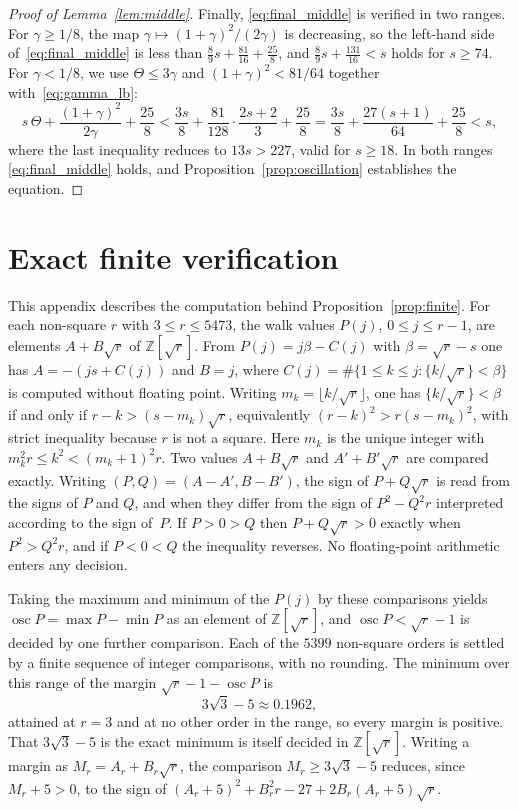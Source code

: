 \documentclass{birkjour}
\theoremstyle{definition}
\theoremstyle{remark}
\newcommand{\fl}[1]{\lfloor #1 \rfloor}
\newcommand{\frc}[1]{\{ #1 \}}
\begin{document}
\begin{proof}[Proof of Lemma~\ref{lem:middle}]
Finally, \eqref{eq:final_middle} is verified in two
ranges. For $\gamma\ge 1/8$, the map
$\gamma\mapsto(1+\gamma)^{2}/(2\gamma)$ is decreasing,
so the left-hand side of~\eqref{eq:final_middle} is less
than $\tfrac{8}{9}s+\tfrac{81}{16}+\tfrac{25}{8}$, and
$\tfrac{8}{9}s+\tfrac{131}{16}<s$ holds for
$s\ge 74$. For $\gamma<1/8$, we use $\Theta\le 3\gamma$
and $(1+\gamma)^{2}<81/64$
together with~\eqref{eq:gamma_lb}:
\[
  s\,\Theta+\frac{(1+\gamma)^{2}}{2\gamma}+\frac{25}{8}
  <\frac{3s}{8}+\frac{81}{128}\cdot\frac{2s+2}{3}
  +\frac{25}{8}
  =\frac{3s}{8}+\frac{27(s+1)}{64}+\frac{25}{8}<s,
\]
where the last inequality reduces to $13s>227$, valid for
$s\ge 18$. In both ranges
\eqref{eq:final_middle} holds, and
Proposition~\ref{prop:oscillation} establishes the equation.
\end{proof}

\section{Exact finite verification}
\label{app:finite}

This appendix describes the computation behind
Proposition~\ref{prop:finite}. For each non-square $r$ with
$3\le r\le 5473$, the walk values $P(j)$, $0\le j\le r-1$,
are elements $A+B\sqrt{r}$ of $\mathbb{Z}[\sqrt{r}]$. From
$P(j)=j\beta-C(j)$ with $\beta=\sqrt{r}-s$ one has
$A=-(js+C(j))$ and $B=j$, where
$C(j)=\#\{1\le k\le j:\frc{k/\!\sqrt{r}}<\beta\}$ is computed
without floating point. Writing $m_{k}=\fl{k/\!\sqrt{r}}$, one
has $\frc{k/\!\sqrt{r}}<\beta$ if and only if
$r-k>(s-m_{k})\sqrt{r}$, equivalently
$(r-k)^{2}>r(s-m_{k})^{2}$, with strict inequality because $r$
is not a square. Here $m_{k}$ is the unique integer with
$m_{k}^{2}r\le k^{2}<(m_{k}+1)^{2}r$. Two values
$A+B\sqrt{r}$ and $A'+B'\sqrt{r}$ are compared exactly.
Writing $(P,Q)=(A-A',B-B')$, the sign of $P+Q\sqrt{r}$ is read
from the signs of $P$ and $Q$, and when they differ from the
sign of $P^{2}-Q^{2}r$ interpreted according to the sign
of~$P$. If $P>0>Q$ then $P+Q\sqrt{r}>0$ exactly when
$P^{2}>Q^{2}r$, and if $P<0<Q$ the inequality reverses. No
floating-point arithmetic enters any decision.

Taking the maximum and minimum of the $P(j)$ by these
comparisons yields $\operatorname{osc}P=\max P-\min P$ as an
element of $\mathbb{Z}[\sqrt{r}]$, and
$\operatorname{osc}P<\sqrt{r}-1$ is decided by one further
comparison. Each of the $5399$ non-square orders is settled by
a finite sequence of integer comparisons, with no rounding.
The minimum over this range of the margin
$\sqrt{r}-1-\operatorname{osc}P$ is
\[
  3\sqrt{3}-5\approx 0.1962,
\]
attained at $r=3$ and at no other order in the range, so
every margin is positive. That
$3\sqrt{3}-5$ is the exact minimum is itself decided in
$\mathbb{Z}[\sqrt{r}]$. Writing a margin as
$M_{r}=A_{r}+B_{r}\sqrt{r}$, the comparison
$M_{r}\ge 3\sqrt{3}-5$ reduces, since $M_{r}+5>0$, to the sign
of $(A_{r}+5)^{2}+B_{r}^{2}r-27+2B_{r}(A_{r}+5)\sqrt{r}$.
\end{document}
